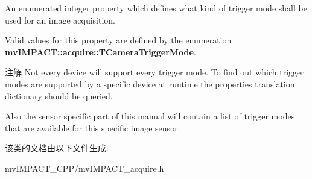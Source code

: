 An enumerated integer property which defines what kind of trigger mode shall be used for an image acquisition. 

Valid values for this property are defined by the enumeration {\bfseries mv\+I\+M\+P\+A\+C\+T\+::acquire\+::\+T\+Camera\+Trigger\+Mode}.

\begin{DoxyNote}{注解}
Not every device will support every trigger mode. To find out which trigger modes are supported by a specific device at runtime the properties translation dictionary should be queried.

Also the sensor specific part of this manual will contain a list of trigger modes that are available for this specific image sensor. 
\end{DoxyNote}


该类的文档由以下文件生成\+:\begin{DoxyCompactItemize}
\item 
mv\+I\+M\+P\+A\+C\+T\+\_\+\+C\+P\+P/mv\+I\+M\+P\+A\+C\+T\+\_\+acquire.\+h\end{DoxyCompactItemize}
